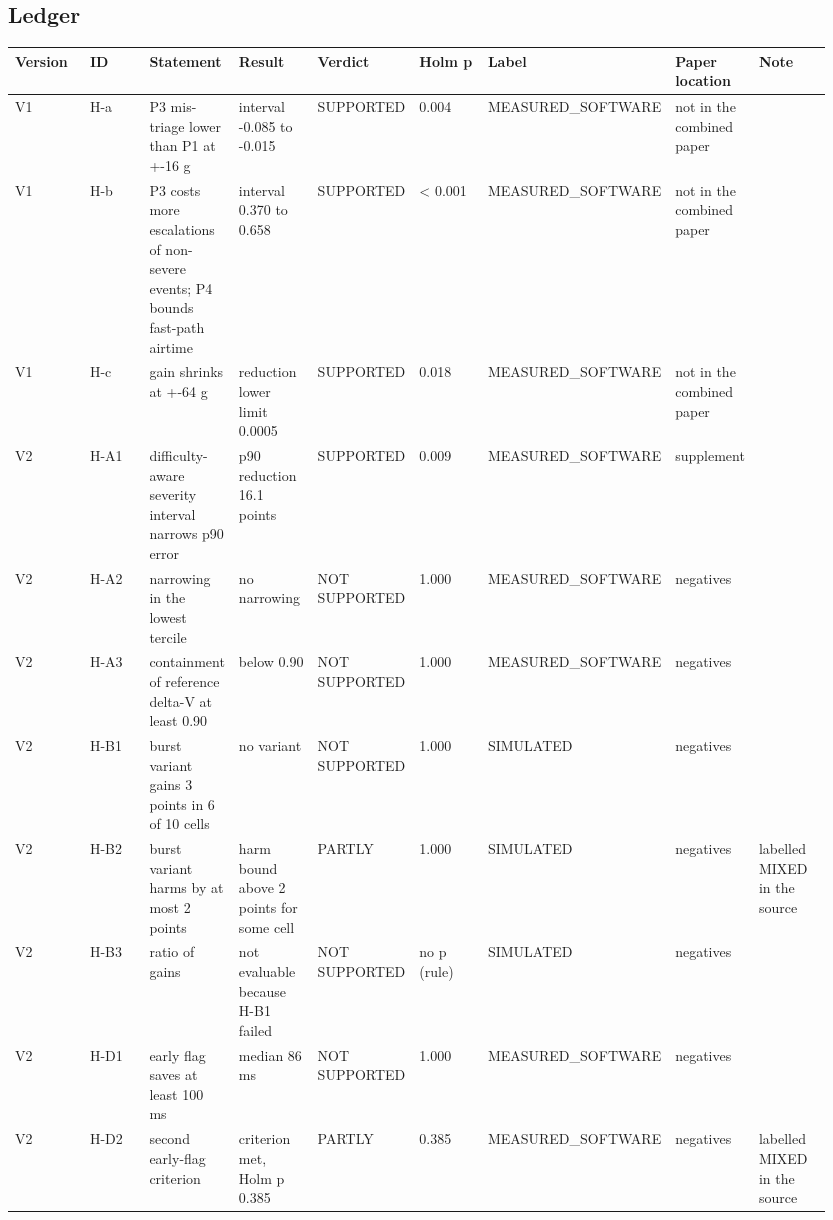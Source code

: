 \subsection*{Ledger}

{\scriptsize\raggedright
\begin{longtable}{p{0.106\linewidth}p{0.106\linewidth}p{0.106\linewidth}p{0.106\linewidth}p{0.106\linewidth}p{0.106\linewidth}p{0.106\linewidth}p{0.106\linewidth}p{0.106\linewidth}}
\toprule
Version & ID & Statement & Result & Verdict & Holm p & Label & Paper location & Note \\
\midrule
\endhead
V1 & H-a & P3 mis-triage lower than P1 at +-16 g & interval -0.085 to -0.015 & SUPPORTED & 0.004 & MEASURED\_SOFTWARE & not in the combined paper &  \\
V1 & H-b & P3 costs more escalations of non-severe events; P4 bounds fast-path airtime & interval 0.370 to 0.658 & SUPPORTED & < 0.001 & MEASURED\_SOFTWARE & not in the combined paper &  \\
V1 & H-c & gain shrinks at +-64 g & reduction lower limit 0.0005 & SUPPORTED & 0.018 & MEASURED\_SOFTWARE & not in the combined paper &  \\
V2 & H-A1 & difficulty-aware severity interval narrows p90 error & p90 reduction 16.1 points & SUPPORTED & 0.009 & MEASURED\_SOFTWARE & supplement &  \\
V2 & H-A2 & narrowing in the lowest tercile & no narrowing & NOT SUPPORTED & 1.000 & MEASURED\_SOFTWARE & negatives &  \\
V2 & H-A3 & containment of reference delta-V at least 0.90 & below 0.90 & NOT SUPPORTED & 1.000 & MEASURED\_SOFTWARE & negatives &  \\
V2 & H-B1 & burst variant gains 3 points in 6 of 10 cells & no variant & NOT SUPPORTED & 1.000 & SIMULATED & negatives &  \\
V2 & H-B2 & burst variant harms by at most 2 points & harm bound above 2 points for some cell & PARTLY & 1.000 & SIMULATED & negatives & labelled MIXED in the source \\
V2 & H-B3 & ratio of gains & not evaluable because H-B1 failed & NOT SUPPORTED & no p (rule) & SIMULATED & negatives &  \\
V2 & H-D1 & early flag saves at least 100 ms & median 86 ms & NOT SUPPORTED & 1.000 & MEASURED\_SOFTWARE & negatives &  \\
V2 & H-D2 & second early-flag criterion & criterion met, Holm p 0.385 & PARTLY & 0.385 & MEASURED\_SOFTWARE & negatives & labelled MIXED in the source \\

\end{longtable}}
